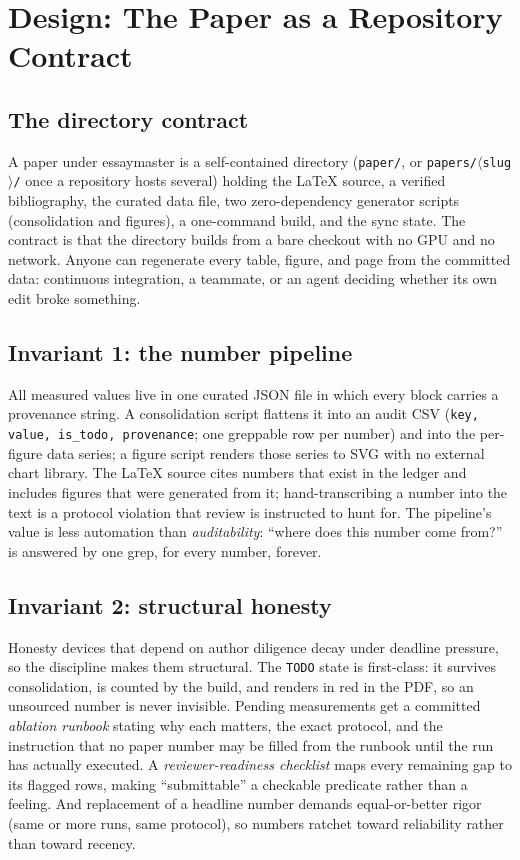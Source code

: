 \documentclass{article}
\begin{document}
\section{Design: The Paper as a Repository Contract}
\label{sec:design}

\subsection{The directory contract}
A paper under essaymaster is a self-contained directory (\texttt{paper/}, or
\texttt{papers/$\langle$slug$\rangle$/} once a repository hosts several) holding the
LaTeX source, a verified bibliography, the curated data file, two zero-dependency
generator scripts (consolidation and figures), a one-command build, and the sync
state. The contract is that the directory builds from a bare checkout with no GPU and
no network. Anyone can regenerate every table, figure, and page from the committed
data: continuous integration, a teammate, or an agent deciding whether its own edit
broke something.

\subsection{Invariant 1: the number pipeline}
\label{sec:pipeline}
All measured values live in one curated JSON file in which every block carries a
provenance string. A consolidation script flattens it into an audit CSV
(\texttt{key, value, is\_todo, provenance}; one greppable row per number) and into
the per-figure data series; a figure script renders those series to SVG with no
external chart library. The LaTeX source cites numbers that exist in the ledger and
includes figures that were generated from it; hand-transcribing a number into the
text is a protocol violation that review is instructed to hunt for. The pipeline's
value is less automation than \emph{auditability}: ``where does this number come
from?'' is answered by one grep, for every number, forever.

\subsection{Invariant 2: structural honesty}
\label{sec:honesty}
Honesty devices that depend on author diligence decay under deadline pressure, so the
discipline makes them structural. The \texttt{TODO} state is first-class: it survives
consolidation, is counted by the build, and renders in red in the PDF, so an
unsourced number is never invisible. Pending measurements get a committed
\emph{ablation runbook} stating why each matters, the exact protocol, and the
instruction that no paper number may be filled from the runbook until the run has
actually executed. A \emph{reviewer-readiness checklist} maps every remaining gap to
its flagged rows, making ``submittable'' a checkable predicate rather than a feeling.
And replacement of a headline number demands equal-or-better rigor (same or more
runs, same protocol), so numbers ratchet toward reliability rather than toward
recency.
\end{document}
